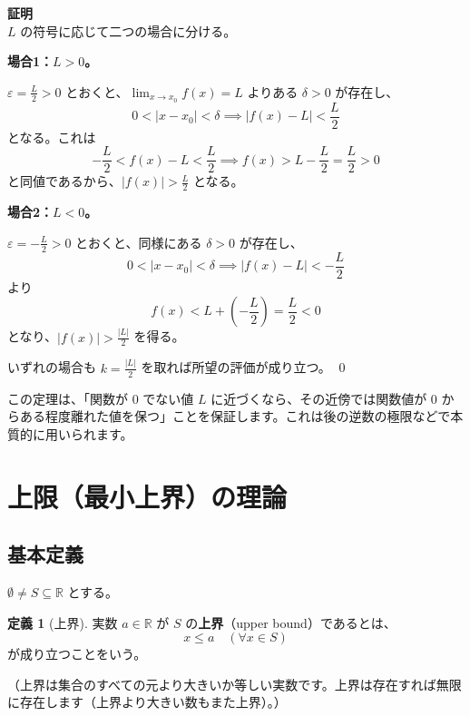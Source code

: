 \documentclass[11pt,a4paper]{jsarticle}
\theoremstyle{definition}
\newtheorem{definition}{定義}[section]
\newcommand{\R}{\mathbb{R}}
\newcommand{\eps}{\varepsilon}
\newcommand{\kaisetsu}[1]{\textcolor{darkblue!70!black}{\small（#1）}}
\begin{document}
\begin{proofbox}
\textbf{証明}\ \\
\noindent
$L$ の符号に応じて二つの場合に分ける。

\textbf{場合1：$L > 0$。}

$\eps = \frac{L}{2} > 0$ とおくと、$\lim_{x \to x_0} f(x) = L$ よりある $\delta > 0$ が存在し、
\[
0 < |x - x_0| < \delta \implies |f(x) - L| < \frac{L}{2}
\]
となる。これは
\[
-\frac{L}{2} < f(x) - L < \frac{L}{2}
\implies
f(x) > L - \frac{L}{2} = \frac{L}{2} > 0
\]
と同値であるから、$|f(x)| > \frac{L}{2}$ となる。

\textbf{場合2：$L < 0$。}

$\eps = -\frac{L}{2} > 0$ とおくと、同様にある $\delta > 0$ が存在し、
\[
0 < |x - x_0| < \delta \implies |f(x) - L| < -\frac{L}{2}
\]
より
\[
f(x) < L + \left(-\frac{L}{2}\right) = \frac{L}{2} < 0
\]
となり、$|f(x)| > \frac{|L|}{2}$ を得る。

いずれの場合も $k = \frac{|L|}{2}$ を取れば所望の評価が成り立つ。 \qed
\end{proofbox}

\begin{notebox}[直感的解釈]
この定理は、「関数が 0 でない値 $L$ に近づくなら、その近傍では関数値が 0 からある程度離れた値を保つ」ことを保証します。これは後の逆数の極限などで本質的に用いられます。
\end{notebox}

\newpage

\section{上限（最小上界）の理論}\label{sec:supremum}

\subsection{基本定義}

$\emptyset \neq S \subseteq \R$ とする。

\begin{definitionbox}[定義：上界]
\begin{definition}[上界]\label{def:upper-bound}
実数 $a \in \R$ が $S$ の\textbf{上界}（upper bound）であるとは、
\[
x \leq a \quad (\forall x \in S)
\]
が成り立つことをいう。
\end{definition}
\kaisetsu{上界は集合のすべての元より大きいか等しい実数です。上界は存在すれば無限に存在します（上界より大きい数もまた上界）。}
\end{definitionbox}
\end{document}

